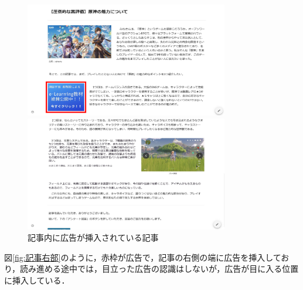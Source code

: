 \documentclass[12pt,a4j,titlepage]{ltjsarticle}
\begin{document}
\begin{figure}[H]
  \begin{minipage}[b]{0.50\linewidth}
    \centering
    \includegraphics[height=50mm]{figures/記事内_1.pdf}
  \end{minipage}
  \begin{minipage}[b]{0.50\linewidth}
    \centering
    \includegraphics[height=50mm]{figures/記事内_2.pdf}
  \end{minipage}
   \caption{記事内に広告が挿入されている記事}
    \label{fig:記事内}
\end{figure}

図\ref{fig:記事右部}のように，赤枠が広告で，記事の右側の端に広告を挿入しており，読み進める途中では，目立った広告の認識はしないが，広告が目に入る位置に挿入している．
\end{document}
